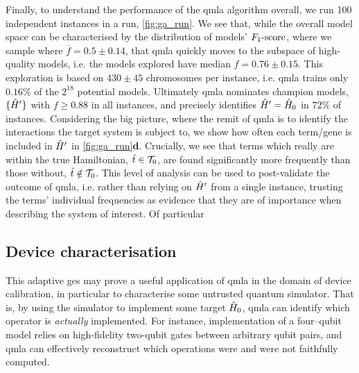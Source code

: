 Finally, to understand the performance of the \gls{qmla} algorithm overall, 
    we run 100 independent instances in a \gls{run}, \cref{fig:ga_run}. 
We see that, while the overall model space can be characterised by the distribution 
    of models' $ F_{1}\text{-score} $, where we sample where $\overbar{f} = 0.5 \pm 0.14$, 
    that \gls{qmla} quickly moves to the subspace of high-quality models, 
    i.e. the models explored have median $f = 0.76 \pm 0.15$.
This exploration is based on $430 \pm 45$ chromosomes per instance, 
    i.e. \gls{qmla} trains only $0.16\%$ of the $2^{18}$ potential models. 
Ultimately \gls{qmla} nominates champion models, $\{ \hat{H}^{\prime} \}$ with $f \geq 0.88$ in all instances, 
    and precisely identifies $\hat{H}^{\prime}=\hat{H}_0$ in $72\%$ of instances. 
Considering the big picture, where the remit of \gls{qmla} is to identify the interactions 
    the target system is subject to, we show how often each term/gene is included in $\hat{H}^{\prime}$ in 
    \cref{fig:ga_run}\textbf{d}. 
Crucially, we see that terms which really are within the true Hamiltonian, $\hat{t} \in { \mathcal{T} }_0$, 
    are found significantly more frequently than those without, $\hat{t} \notin { \mathcal{T} }_0$. 
This level of analysis can be used to post-validate the outcome of \gls{qmla}, 
    i.e. rather than relying on $\hat{H}^{\prime}$ from a single instance, 
    trusting the terms' individual frequencies as evidence that they are of importance when describing 
    the system of interest. 
Of particular 

\subsection{Device characterisation}
This adaptive \gls{ges} may prove a useful application of \gls{qmla} in the domain of device calibration,
    in particular to characterise some untrusted quantum simulator.
That is, by using the simulator to implement some target $\hat{H}_0$, 
    \gls{qmla} can identify which operator is \emph{actually} implemented.
For instance, implementation of a four--qubit model
    relies on high-fidelity two-qubit gates between arbitrary qubit pairs, 
    and \gls{qmla} can effectively reconstruct which operations were and were not faithfully computed.
